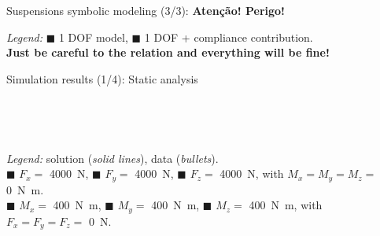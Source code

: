 \begin{frame}{Suspensions symbolic modeling (3/3): \textcolor{mycolor2}{\textbf{Atenção! Perigo!}}}
   \\[0.5em]
  \begin{center}
    \emph{Legend:}
    {\color{mycolor1}$\blacksquare$} 1 DOF model, {\color{mycolor2}$\blacksquare$} 1 DOF + compliance contribution. \\[0.5em]
    \textcolor{mycolor5}{\textbf{Just be careful to the relation  and everything will be fine!}}
  \end{center}
\end{frame}


\begin{frame}{Simulation results (1/4): Static analysis}
  \begin{center}
    \begin{minipage}[c]{0.485\linewidth}
       \\[0.5em]
    \end{minipage}
    \begin{minipage}[c]{0.485\linewidth}
       \\[0.5em]
    \end{minipage}
    \raggedright{\small{\emph{Legend:} \TrussMe{} solution (\emph{solid lines}), \Ansys{} data (\emph{bullets}). \\ {\color{mycolor1}$\blacksquare$} $F_x =$ \SI{4000}{\newton}, {\color{mycolor2}$\blacksquare$} $F_y =$ \SI{4000}{\newton}, {\color{mycolor3}$\blacksquare$} $F_z =$ \SI{4000}{\newton}, with $M_x = M_y = M_z =$ \SI{0}{\newton\meter}. \\ {\color{mycolor4}$\blacksquare$} $M_x =$ \SI{400}{\newton\meter}, {\color{mycolor5}$\blacksquare$} $M_y =$ \SI{400}{\newton\meter}, {\color{mycolor6}$\blacksquare$} $M_z =$ \SI{400}{\newton\meter}, with $F_x = F_y = F_z =$ \SI{0}{\newton}.}}
  \end{center}
\end{frame}

